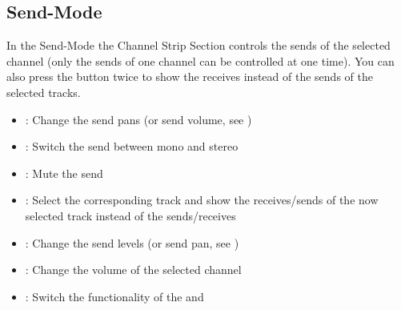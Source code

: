 \subsection{Send-Mode}\label{sendmode}

In the Send-Mode the Channel Strip Section controls the sends of the
selected channel (only the sends of one  channel can be
controlled at one time). You can also press the \send button
twice to show the receives instead of the sends of the selected
tracks.

\begin{itemize}
\item \vpots: Change the send pans (or send volume, see \flip)
\item \solo: Switch the send between mono and stereo
\item \mute: Mute the send
\item \select: Select the corresponding track and show the receives/sends of
the now selected track instead of the sends/receives
\item \faders: Change the send levels (or send pan, see \flip)

\item \mfader: Change the volume of the selected channel

\item \flip: Switch the functionality of the \faders and \vpots
\end{itemize}
 
